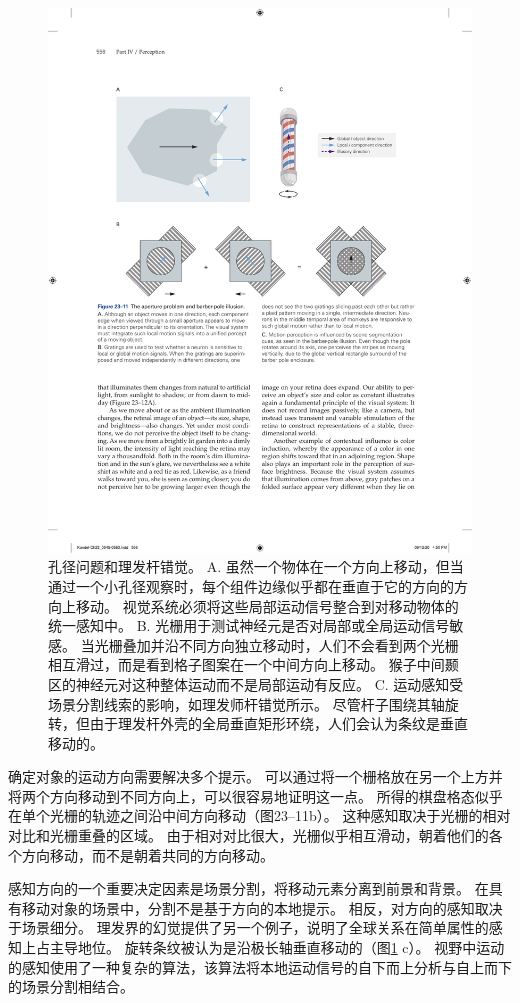 \begin{figure}[htbp]
	\centering
	\includegraphics[width=0.8\linewidth]{chap23/fig_23_11}
	\caption{孔径问题和理发杆错觉。 A. 虽然一个物体在一个方向上移动，但当通过一个小孔径观察时，每个组件边缘似乎都在垂直于它的方向的方向上移动。 视觉系统必须将这些局部运动信号整合到对移动物体的统一感知中。 B. 光栅用于测试神经元是否对局部或全局运动信号敏感。 当光栅叠加并沿不同方向独立移动时，人们不会看到两个光栅相互滑过，而是看到格子图案在一个中间方向上移动。 猴子中间颞区的神经元对这种整体运动而不是局部运动有反应。 C. 运动感知受场景分割线索的影响，如理发师杆错觉所示。 尽管杆子围绕其轴旋转，但由于理发杆外壳的全局垂直矩形环绕，人们会认为条纹是垂直移动的。}
	\label{fig:23_11}
\end{figure}


确定对象的运动方向需要解决多个提示。
可以通过将一个栅格放在另一个上方并将两个方向移动到不同方向上，可以很容易地证明这一点。
所得的棋盘格态似乎在单个光栅的轨迹之间沿中间方向移动（图23–11b）。 
这种感知取决于光栅的相对对比和光栅重叠的区域。 
由于相对对比很大，光栅似乎相互滑动，朝着他们的各个方向移动，而不是朝着共同的方向移动。


感知方向的一个重要决定因素是场景分割，将移动元素分离到前景和背景。
在具有移动对象的场景中，分割不是基于方向的本地提示。
相反，对方向的感知取决于场景细分。
理发界的幻觉提供了另一个例子，说明了全球关系在简单属性的感知上占主导地位。
旋转条纹被认为是沿极长轴垂直移动的（图\ref{fig:23_11} c）。 
视野中运动的感知使用了一种复杂的算法，该算法将本地运动信号的自下而上分析与自上而下的场景分割相结合。


